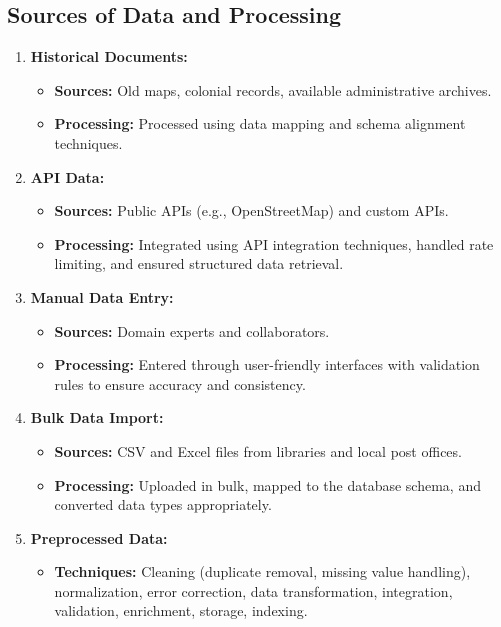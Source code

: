 \subsection{Sources of Data and Processing}
\begin{enumerate}[label=\arabic*.]
    \item \textbf{Historical Documents:}
    \begin{itemize}
        \item \textbf{Sources:} Old maps, colonial records, available administrative archives.
        \item \textbf{Processing:} Processed using data mapping and schema alignment techniques.
    \end{itemize}
    
    \item \textbf{API Data:}
    \begin{itemize}
        \item \textbf{Sources:} Public APIs (e.g., OpenStreetMap) and custom APIs.
        \item \textbf{Processing:} Integrated using API integration techniques, handled rate limiting, and ensured structured data retrieval.
    \end{itemize}
    
    \item \textbf{Manual Data Entry:}
    \begin{itemize}
        \item \textbf{Sources:} Domain experts and collaborators.
        \item \textbf{Processing:} Entered through user-friendly interfaces with validation rules to ensure accuracy and consistency.
    \end{itemize}
    
    \item \textbf{Bulk Data Import:}
    \begin{itemize}
        \item \textbf{Sources:} CSV and Excel files from libraries and local post offices.
        \item \textbf{Processing:} Uploaded in bulk, mapped to the database schema, and converted data types appropriately.
    \end{itemize}
    
    \item \textbf{Preprocessed Data:}
    \begin{itemize}
        \item \textbf{Techniques:} Cleaning (duplicate removal, missing value handling), normalization, error correction, data transformation, integration, validation, enrichment, storage, indexing.
    \end{itemize}
\end{enumerate}

